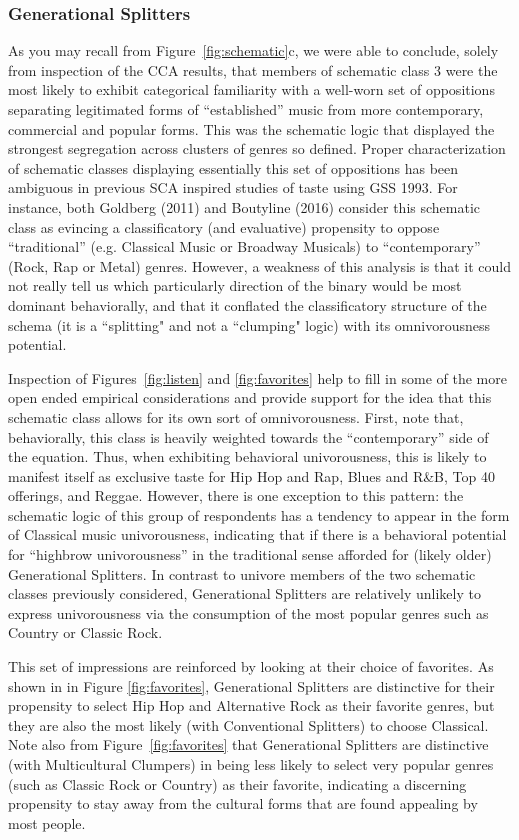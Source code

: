 \documentclass[preprint,12pt]{elsarticle}
\begin{document}
\subsubsection{Generational Splitters}
As you may recall from Figure~\ref{fig:schematic}c, we were able to conclude, solely from inspection of the CCA results, that members of schematic class 3 were the most likely to exhibit categorical familiarity with a well-worn set of oppositions separating legitimated forms of ``established'' music from more contemporary, commercial and popular forms. This was the schematic logic that displayed the strongest segregation across clusters of genres so defined. Proper characterization of schematic classes displaying essentially this set of oppositions has been ambiguous in previous SCA inspired studies of taste using GSS 1993. For instance, both Goldberg (2011) and Boutyline (2016) consider this schematic class as evincing a classificatory (and evaluative) propensity to oppose ``traditional'' (e.g. Classical Music or Broadway Musicals) to ``contemporary'' (Rock, Rap or Metal) genres. However, a weakness of this analysis is that it could not really tell us which particularly direction of the binary would be most dominant behaviorally, and that it conflated the classificatory structure of the schema (it is a ``splitting" and not a ``clumping" logic) with its omnivorousness potential. 

Inspection of Figures~\ref{fig:listen} and \ref{fig:favorites} help to fill in some of the more open ended empirical considerations and provide support for the idea that this schematic class allows for its own sort of omnivorousness. First, note that, behaviorally, this class is heavily weighted towards the ``contemporary'' side of the equation. Thus, when exhibiting behavioral univorousness, this is likely to manifest itself as exclusive taste for Hip Hop and Rap, Blues and R\&B, Top 40 offerings, and Reggae. However, there is one exception to this pattern: the schematic logic of this group of respondents has a tendency to appear in the form of Classical music univorousness, indicating that if there is a behavioral potential for ``highbrow univorousness'' in the traditional sense afforded for (likely older) Generational Splitters. In contrast to univore members of the two schematic classes previously considered, Generational Splitters are relatively unlikely to express univorousness via the consumption of the most popular genres such as Country or Classic Rock. 

This set of impressions are reinforced by looking at their choice of favorites. As shown in in Figure \ref{fig:favorites}, Generational Splitters are distinctive for their propensity to select Hip Hop and Alternative Rock as their favorite genres, but they are also the most likely (with Conventional Splitters) to choose Classical. Note also from Figure~\ref{fig:favorites} that Generational Splitters are distinctive (with Multicultural Clumpers) in being less likely to select very popular genres (such as Classic Rock or Country) as their favorite, indicating a discerning propensity to stay away from the cultural forms that are found appealing by most people. 
\end{document}
